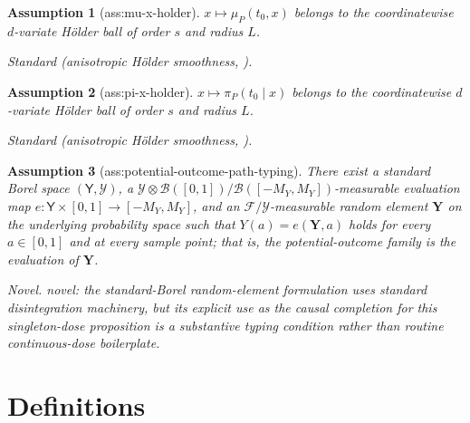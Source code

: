 \documentclass{article}
\newtheorem{assumption}{Assumption}
\begin{document}
\begin{assumption}[ass:mu-x-holder]\label{ass:mu-x-holder}
\(x\mapsto\mu_P(t_0,x)\) belongs to the coordinatewise \(d\)-variate Hölder ball of order \(s\) and radius \(L\).
\par\smallskip\noindent\emph{Standard} (anisotropic Hölder smoothness, \cite{Tsybakov2009}).
\end{assumption}

\begin{assumption}[ass:pi-x-holder]\label{ass:pi-x-holder}
\(x\mapsto\pi_P(t_0\mid x)\) belongs to the coordinatewise \(d\)-variate Hölder ball of order \(s\) and radius \(L\).
\par\smallskip\noindent\emph{Standard} (anisotropic Hölder smoothness, \cite{Tsybakov2009}).
\end{assumption}

\begin{assumption}[ass:potential-outcome-path-typing]\label{ass:potential-outcome-path-typing}
There exist a standard Borel space \((\mathsf Y,\mathcal Y)\), a \(\mathcal Y\otimes\mathcal B([0,1])/\mathcal B([-M_Y,M_Y])\)-measurable evaluation map \(e:\mathsf Y\times[0,1]\to[-M_Y,M_Y]\), and an \(\mathcal F/\mathcal Y\)-measurable random element \(\mathbf Y\) on the underlying probability space such that \(Y(a)=e(\mathbf Y,a)\) holds for every \(a\in[0,1]\) and at every sample point; that is, the potential-outcome family is the evaluation of \(\mathbf Y\).
\par\smallskip\noindent\emph{Novel.} novel: the standard-Borel random-element formulation uses standard disintegration machinery, but its explicit use as the causal completion for this singleton-dose proposition is a substantive typing condition rather than routine continuous-dose boilerplate.
\end{assumption}

\section{Definitions}
\end{document}

